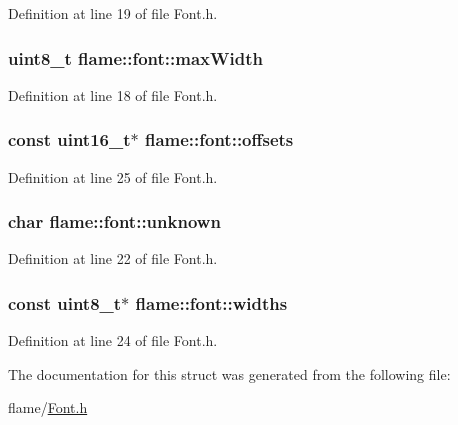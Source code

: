 Definition at line 19 of file Font.\-h.

\hypertarget{structflame_1_1font_aea35e5714307ab12864914066afdf240}{
\subsubsection[{max\-Width}]{\setlength{\rightskip}{0pt plus 5cm}uint8\-\_\-t flame\-::font\-::max\-Width}}\label{structflame_1_1font_aea35e5714307ab12864914066afdf240}


Definition at line 18 of file Font.\-h.

\hypertarget{structflame_1_1font_a6038d663e6abc38afb5af78c841a97c9}{
\subsubsection[{offsets}]{\setlength{\rightskip}{0pt plus 5cm}const uint16\-\_\-t$\ast$ flame\-::font\-::offsets}}\label{structflame_1_1font_a6038d663e6abc38afb5af78c841a97c9}


Definition at line 25 of file Font.\-h.

\hypertarget{structflame_1_1font_a4ea62d516f3a369f13274524b77cc00c}{
\subsubsection[{unknown}]{\setlength{\rightskip}{0pt plus 5cm}char flame\-::font\-::unknown}}\label{structflame_1_1font_a4ea62d516f3a369f13274524b77cc00c}


Definition at line 22 of file Font.\-h.

\hypertarget{structflame_1_1font_ab7d5ef1be33ef6dd3c2e91da39d31245}{
\subsubsection[{widths}]{\setlength{\rightskip}{0pt plus 5cm}const uint8\-\_\-t$\ast$ flame\-::font\-::widths}}\label{structflame_1_1font_ab7d5ef1be33ef6dd3c2e91da39d31245}


Definition at line 24 of file Font.\-h.



The documentation for this struct was generated from the following file\-:\begin{DoxyCompactItemize}
\item 
flame/\hyperlink{_font_8h}{Font.\-h}\end{DoxyCompactItemize}
